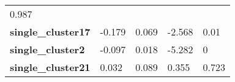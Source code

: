 \documentclass[]{article}
\begin{document}
\begin{longtable}[c]{@{}lllll@{}}
\begin{minipage}[t]{0.12\columnwidth}
0.987
\strut\end{minipage}\tabularnewline
\begin{minipage}[t]{0.31\columnwidth}\raggedright\strut
\textbf{single\_cluster17}
\strut\end{minipage} &
\begin{minipage}[t]{0.13\columnwidth}\raggedright\strut
-0.179
\strut\end{minipage} &
\begin{minipage}[t]{0.16\columnwidth}\raggedright\strut
0.069
\strut\end{minipage} &
\begin{minipage}[t]{0.12\columnwidth}\raggedright\strut
-2.568
\strut\end{minipage} &
\begin{minipage}[t]{0.12\columnwidth}\raggedright\strut
0.01
\strut\end{minipage}\tabularnewline
\begin{minipage}[t]{0.31\columnwidth}\raggedright\strut
\textbf{single\_cluster2}
\strut\end{minipage} &
\begin{minipage}[t]{0.13\columnwidth}\raggedright\strut
-0.097
\strut\end{minipage} &
\begin{minipage}[t]{0.16\columnwidth}\raggedright\strut
0.018
\strut\end{minipage} &
\begin{minipage}[t]{0.12\columnwidth}\raggedright\strut
-5.282
\strut\end{minipage} &
\begin{minipage}[t]{0.12\columnwidth}\raggedright\strut
0
\strut\end{minipage}\tabularnewline
\begin{minipage}[t]{0.31\columnwidth}\raggedright\strut
\textbf{single\_cluster21}
\strut\end{minipage} &
\begin{minipage}[t]{0.13\columnwidth}\raggedright\strut
0.032
\strut\end{minipage} &
\begin{minipage}[t]{0.16\columnwidth}\raggedright\strut
0.089
\strut\end{minipage} &
\begin{minipage}[t]{0.12\columnwidth}\raggedright\strut
0.355
\strut\end{minipage} &
\begin{minipage}[t]{0.12\columnwidth}\raggedright\strut
0.723
\strut\end{minipage}\tabularnewline

\end{longtable}
\end{document}
